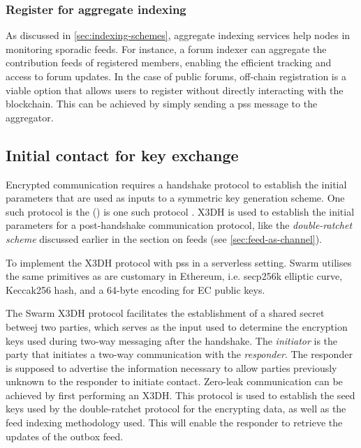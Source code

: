 \subsubsection{Register for aggregate indexing}

As discussed in \ref{sec:indexing-schemes}, aggregate indexing services help nodes in monitoring sporadic feeds. For instance, a forum indexer can aggregate the contribution feeds of registered members, enabling the efficient tracking and access to forum updates. In the case of public forums, off-chain registration is a viable option that allows users to register without directly interacting with the blockchain. This can be achieved by simply sending a pss message to the aggregator. 


\subsection{Initial contact for key exchange\statusgreen}\label{sec:pss-key-exchange}


Encrypted communication requires a handshake protocol to establish the initial parameters that are used as inputs to a symmetric key generation scheme. One such protocol is the  () is one such protocol \cite{marlinspike2016x3dh}.  X3DH is used to establish the initial parameters for a post-handshake communication protocol, like the \emph{double-ratchet scheme} discussed earlier in the section on feeds (see \ref{sec:feed-as-channel}). 

To implement the X3DH protocol with pss in a serverless setting. Swarm utilises the same primitives as are customary in Ethereum, i.e. secp256k elliptic curve, Keccak256 hash, and a 64-byte encoding for EC public keys. 

The Swarm X3DH protocol facilitates the establishment of a shared secret betweej two parties, which serves as the input used to determine the encryption keys used during two-way messaging after the handshake. The \emph{initiator} is the party that initiates a two-way communication with the \emph{responder}. The responder is supposed to advertise the information necessary to allow parties previously unknown to the responder to initiate contact. Zero-leak communication can be achieved by first performing an X3DH. This protocol is used to establish the seed keys used by the double-ratchet protocol for the encrypting data, as well as the feed indexing methodology used. This will enable the responder to retrieve the updates of the outbox feed.


